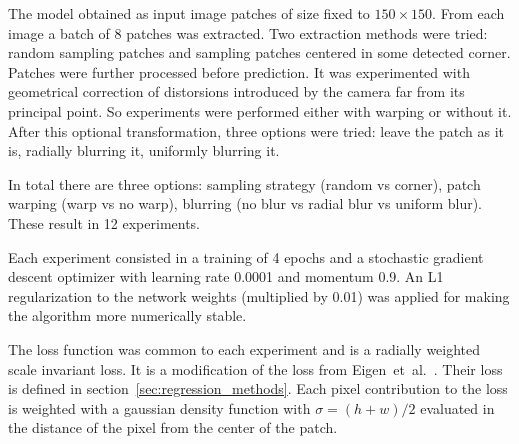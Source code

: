 The model obtained as input image patches of size fixed to $150 \times 150$.
From each image a batch of 8 patches was extracted.
Two extraction methods were tried: random sampling patches and sampling patches centered in some detected corner.
Patches were further processed before prediction.
It was experimented with geometrical correction of distorsions introduced by the camera far from its principal point.
So experiments were performed either with warping or without it.
After this optional transformation, three options were tried: leave the patch as it is, radially blurring it, uniformly blurring it.

In total there are three options: sampling strategy (random vs corner), patch warping (warp vs no warp), blurring (no blur vs radial blur vs uniform blur).
These result in 12 experiments.

Each experiment consisted in a training of 4 epochs and a stochastic gradient descent optimizer with learning rate 0.0001 and momentum 0.9.
An L1 regularization to the network weights (multiplied by 0.01) was applied for making the algorithm more numerically stable.

The loss function was common to each experiment and is a radially weighted scale invariant loss.
It is a modification of the loss from Eigen~et~al.~\cite{Eigen}.
Their loss is defined in section~\ref{sec:regression_methods}.
Each pixel contribution to the loss is weighted with a gaussian density function with $\sigma = (h + w) / 2$ evaluated in the distance of the pixel from the center of the patch.

